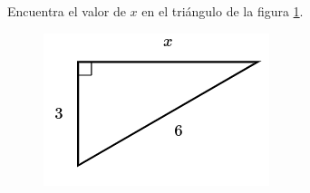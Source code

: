 Encuentra el valor de $x$ en el triángulo de la figura \ref{fig:lados_pitagoras_33}.

\begin{minipage}[t][][t]{0.35\textwidth}
    \begin{figure}[H]
        \centering
        \includegraphics[width=0.9\linewidth]{../images/lados_pitagoras_33.png}

        \caption{}
        \label{fig:lados_pitagoras_33}
    \end{figure}
\end{minipage}\hfill

